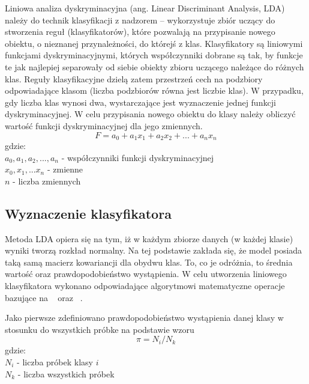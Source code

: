 \documentclass[[10pt,a4paper]{article}
\begin{document}
 Liniowa analiza dyskryminacyjna (ang. Linear Discriminant Analysis, LDA) należy do technik klasyfikacji z nadzorem – wykorzystuje zbiór uczący do stworzenia reguł (klasyfikatorów), które pozwalają na przypisanie nowego obiektu, o nieznanej przynależności, do którejś z klas. Klasyfikatory są liniowymi funkcjami dyskryminacyjnymi, których współczynniki dobrane są tak, by funkcje te jak najlepiej separowały od siebie obiekty zbioru uczącego należące do różnych klas. Reguły klasyfikacyjne dzielą zatem przestrzeń cech na podzbiory odpowiadające klasom (liczba podzbiorów równa jest liczbie klas). W przypadku, gdy liczba klas wynosi dwa, wystarczające jest wyznaczenie jednej funkcji dyskryminacyjnej. W celu przypisania nowego obiektu do klasy należy obliczyć wartość funkcji dyskryminacyjnej dla jego zmiennych. 
\begin{equation}
 F = a_0 + a_1x_1 + a_2x_2 + ... + a_nx_n
 \end{equation}
 gdzie:\\
  \(a_0, a_1, a_2, ...,a_n\) - współczynniki funkcji dyskryminacyjnej\\ \(x_0, x_1, ...x_n\) - zmienne\\ \(n\) - liczba zmiennych\\
  
  \subsection{Wyznaczenie klasyfikatora}
  
Metoda LDA opiera się na tym, iż w każdym zbiorze danych (w każdej klasie) wyniki tworzą rozkład normalny. Na tej podstawie zakłada się, że model posiada taką samą macierz kowariancji dla obydwu klas. To, co je odróżnia, to średnia wartość oraz prawdopodobieństwo wystąpienia. W celu utworzenia liniowego klasyfikatora wykonano odpowiadające algorytmowi matematyczne operacje bazujące na ~\cite{1LDA} oraz ~\cite{2LDA}.

Jako pierwsze zdefiniowano prawdopodobieństwo wystąpienia danej klasy w stosunku do wszystkich próbke na podstawie wzoru
\begin{equation}
 \pi=N_i/N_k
\end{equation}
gdzie:\\
$N_i$ - liczba próbek klasy $i$ \\
$N_k$ - liczba wszystkich próbek\\
\end{document}
